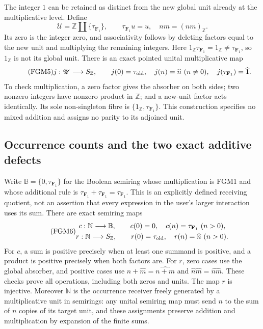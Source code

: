 The integer $1$ can be retained as distinct from the new global unit
already at the multiplicative level. Define
\begin{equation}\tag{FGM4}
 \mathscr U=\mathbb Z\amalg\{\tau_{\mathbf F_1}\},\qquad
 \tau_{\mathbf F_1}u=u,\quad nm=(nm)_{\mathbb Z}.
\end{equation}
Its zero is the integer zero, and associativity follows by deleting
factors equal to the new unit and multiplying the remaining integers.
Here $1_{\mathbb Z}\tau_{\mathbf F_1}=1_{\mathbb Z}\ne
\tau_{\mathbf F_1}$, so $1_{\mathbb Z}$ is not its global unit.
There is an exact pointed unital multiplicative map
\begin{equation}\tag{FGM5}
 j:\mathscr U\longrightarrow S_{\mathbb Z},\qquad
 j(0)=\tau_{\rm old},\quad j(n)=\widehat n\ (n\ne0),\quad
 j(\tau_{\mathbf F_1})=\widehat1.
\end{equation}
To check multiplication, a zero factor gives the absorber on both
sides; two nonzero integers have nonzero product in $\mathbb Z$;
and a new-unit factor acts identically. Its sole non-singleton fibre
is $\{1_{\mathbb Z},\tau_{\mathbf F_1}\}$. This construction specifies
no mixed addition and assigns no parity to its adjoined unit.

\subsection{Occurrence counts and the two exact additive defects}
Write $\mathbb B=\{0,\tau_{\mathbf F_1}\}$ for the Boolean semiring
whose multiplication is FGM1 and whose additional rule is
$\tau_{\mathbf F_1}+\tau_{\mathbf F_1}=\tau_{\mathbf F_1}$.
This is an explicitly defined receiving quotient, not an assertion
that every expression in the user's larger interaction uses its sum.
There are exact semiring maps
\begin{equation}\tag{FGM6}
 \begin{gathered}
 c:\mathbb N\longrightarrow\mathbb B,
 \qquad c(0)=0,\quad c(n)=\tau_{\mathbf F_1}\ (n>0),\\
 r:\mathbb N\longrightarrow S_{\mathbb Z},
 \qquad r(0)=\tau_{\rm old},\quad r(n)=\widehat n\ (n>0).
 \end{gathered}
\end{equation}
For $c$, a sum is positive precisely when at least one summand is
positive, and a product is positive precisely when both factors are.
For $r$, zero cases use the global absorber, and positive cases use
$\widehat n+\widehat m=\widehat{n+m}$ and
$\widehat n\widehat m=\widehat{nm}$. These checks prove all operations,
including both zeros and units. The map $r$ is injective.
Moreover $\mathbb N$ is the occurrence receiver freely generated by a
multiplicative unit in semirings: any unital semiring map must send
$n$ to the sum of $n$ copies of its target unit, and these assignments
preserve addition and multiplication by expansion of the finite sums.

